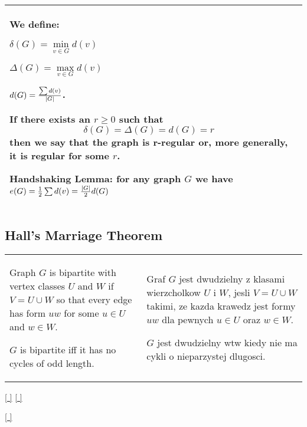 \begin{tabularx}{\textwidth}{ X!{\color{git90gray}\vrule} X}
    We define:\smallskip
    
     $\delta(G)=\min\limits_{v\in G}d(v)$
    \smallskip

     $\Delta(G)=\max\limits_{v\in G}d(v)$
    \smallskip

     $d(G)={\sum d(v)\over |G|}$.
    \medskip

    If there exists an $r\geq 0$ such that
    $$\delta(G)=\Delta(G)=d(G)=r$$
    then we say that the graph is {\color{def}r-regular} or, more generally, it is {\color{acc}regular} for some $r$.
    \medskip

    {\color{def}Handshaking Lemma}: for any graph $G$ we have $e(G)=\frac12\sum d(v)={|G|\over2}d(G)$

    & \\

    \hline

\end{tabularx}

\subsection{Hall's Marriage Theorem}

\begin{tabularx}{\textwidth}{ X!{\color{git90gray}\vrule} X}

    Graph $G$ is {\color{def}bipartite} with vertex classes $U$ and $W$ if $V=U\cup W$ so that every edge has form $uw$ for some $u\in U$ and $w\in W$.
    \smallskip

    $G$ is bipartite iff it has no cycles of odd length.

    &
    Graf $G$ jest {\color{def}dwudzielny} z klasami wierzcholkow $U$ i $W$, jesli $V=U\cup W$ takimi, ze kazda krawedz jest formy $uw$ dla pewnych $u\in U$ oraz $w\in W$.
    \smallskip

    $G$ jest dwudzielny wtw kiedy nie ma cykli o nieparzystej dlugosci.
\end{tabularx}

\hyperref[bipartite-even-cycle-GB]{[ ]} \hyperref[bipartite-even-cycle-PL]{[ ]}
\label{bipartite-even-cycle-LAN}

\medskip

\hyperref[bipartite-even-cycle-LAN]{[ ]}
\label{bipartite-even-cycle-GB}
\medskip

